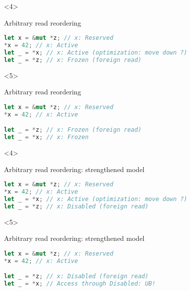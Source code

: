 \begin{frame}[fragile, t]

    \begin{onlyenv}<4>
        \begin{block}{{\cmark} Arbitrary read reordering}
            \begin{lstlisting}[language=rust]
let x = &mut *z; // x: Reserved
*x = 42; // x: Active
let _ = *x; // x: Active (optimization: move down ?)
let _ = *z; // x: Frozen (foreign read)

            \end{lstlisting}
        \end{block}
    \end{onlyenv}

    \begin{onlyenv}<5>
        \begin{block}{{\cmark} Arbitrary read reordering}
            \begin{lstlisting}[language=rust]
let x = &mut *z; // x: Reserved
*x = 42; // x: Active

let _ = *z; // x: Frozen (foreign read)
let _ = *x; // x: Frozen
            \end{lstlisting}
        \end{block}
    \end{onlyenv}

    \begin{onlyenv}<4>
        \begin{errorblock}{{\xmark} Arbitrary read reordering: strengthened model}
            \begin{lstlisting}[language=rust]
let x = &mut *z; // x: Reserved
*x = 42; // x: Active
let _ = *x; // x: Active (optimization: move down ?)
let _ = *z; // x: Disabled (foreign read)

            \end{lstlisting}
        \end{errorblock}
    \end{onlyenv}

    \begin{onlyenv}<5>
        \begin{errorblock}{{\xmark} Arbitrary read reordering: strengthened model}
            \begin{lstlisting}[language=rust]
let x = &mut *z; // x: Reserved
*x = 42; // x: Active

let _ = *z; // x: Disabled (foreign read)
let _ = *x; // Access through Disabled: UB!
            \end{lstlisting}
        \end{errorblock}
    \end{onlyenv}
\end{frame}

